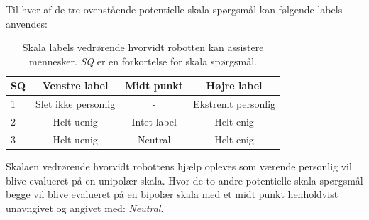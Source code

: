 \noindent
%
Til hver af de tre ovenstående potentielle skala spørgsmål kan følgende labels anvendes:
%
\begin{table}[H]
	\centering
	\begin{tabular}{l|c|c|c}
		SQ     & Venstre label & Midt punkt & Højre label \\\hline
		1   & Slet ikke personlig & - & Ekstremt personlig          \\\hline
		2   & Helt uenig & Intet label & Helt enig   \\\hline
		3   & Helt uenig & Neutral & Helt enig  
	\end{tabular}
\caption{Skala labels vedrørende hvorvidt robotten kan assistere mennesker. \textit{SQ} er en forkortelse for skala spørgsmål.}
	\label{tab:AssistererMennesker}
\end{table}
\noindent
%
Skalaen vedrørende hvorvidt robottens hjælp opleves som værende personlig vil blive evalueret på en unipolær skala. Hvor de to andre potentielle skala spørgsmål begge vil blive evalueret på en bipolær skala med et midt punkt henholdvist unavngivet og angivet med: \textit{Neutral}.
\newpage
%
